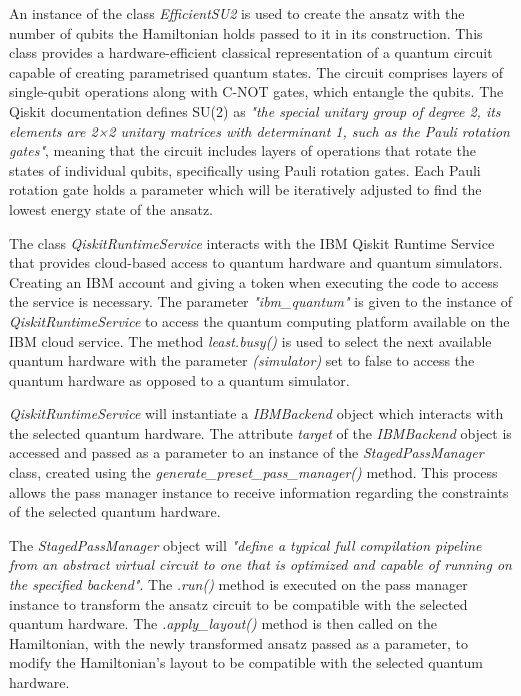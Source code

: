 \documentclass{article}
\begin{document}
An instance of the class \textit{EfficientSU2} is used to create the ansatz with the number of qubits the Hamiltonian holds passed to it in its construction. This class provides a hardware-efficient classical representation of a quantum circuit capable of creating parametrised quantum states. The circuit comprises layers of single-qubit operations along with C-NOT gates, which entangle the qubits. The Qiskit documentation defines SU(2) as \textit{"the special unitary group of degree 2, its elements are 2×2 unitary matrices with determinant 1, such as the Pauli rotation gates"}\cite{EfficientSU2}, meaning that the circuit includes layers of operations that rotate the states of individual qubits, specifically using Pauli rotation gates. Each Pauli rotation gate holds a parameter which will be iteratively adjusted to find the lowest energy state of the ansatz.

The class \textit{QiskitRuntimeService} interacts with the IBM Qiskit Runtime Service that provides cloud-based access to quantum hardware and quantum simulators. Creating an IBM account and giving a token when executing the code to access the service is necessary. The parameter \textit{"ibm\_quantum"} is given to the instance of \textit{QiskitRuntimeService} to access the quantum computing platform available on the IBM cloud service. The method \textit{least.busy()} is used to select the next available quantum hardware with the parameter \textit{(simulator)} set to false to access the quantum hardware as opposed to a quantum simulator. 

\textit{QiskitRuntimeService} will instantiate a \textit{IBMBackend} object which interacts with the selected quantum hardware. The attribute \textit{target} of the \textit{IBMBackend} object is accessed and passed as a parameter to an instance of the \textit{StagedPassManager} class, created using the \textit{generate\_preset\_pass\_manager()} method. This process allows the pass manager instance to receive information regarding the constraints of the selected quantum hardware.

The \textit{StagedPassManager} object will \textit{"define a typical full compilation pipeline from an abstract virtual circuit to one that is optimized and capable of running on the specified backend"}\cite{StagedPassManager}. The \textit{.run()} method is executed on the pass manager instance to transform the ansatz circuit to be compatible with the selected quantum hardware. The \textit{.apply\_layout()} method is then called on the Hamiltonian, with the newly transformed ansatz passed as a parameter, to modify the Hamiltonian's layout to be compatible with the selected quantum hardware. 
\end{document}
